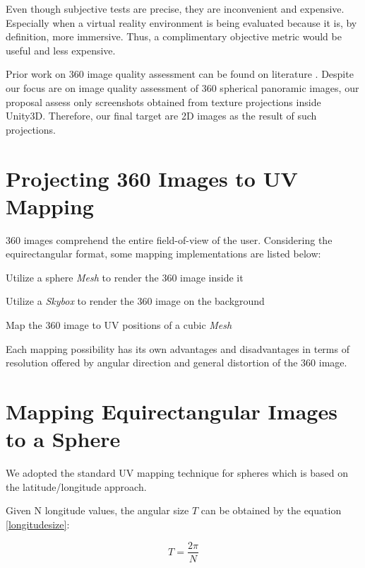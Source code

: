 \documentclass[12pt]{article}
\begin{document}
Even though subjective tests are precise, they are inconvenient and expensive. Especially when a virtual reality environment is being evaluated because it is, by definition, more immersive. Thus, a complimentary objective metric would be useful and less expensive.

Prior work on 360 image quality assessment can be found on literature \cite{md2015full} \cite{zakharchenko2016quality}. Despite our focus are on image quality assessment of 360 spherical panoramic images, our proposal assess only screenshots obtained from texture projections inside Unity3D. Therefore, our final target are 2D images as the result of such projections.

\section{Projecting 360 Images to UV Mapping}
360 images comprehend the entire field-of-view of the user. Considering the equirectangular format, some mapping implementations are listed below:

\begin{enumerate}
  \begin{item}Utilize a sphere \textit{Mesh} to render the 360 image inside it\end{item}
  \begin{item} Utilize a \textit{Skybox} to render the 360 image on the background\end{item}
  \begin{item} Map the 360 image to UV positions of a cubic \textit{Mesh} \end{item}
\end{enumerate}

Each mapping possibility has its own advantages and disadvantages in terms of resolution offered by angular direction and general distortion of the 360 image.

\section{Mapping Equirectangular Images to a Sphere}
We adopted the standard UV mapping technique for spheres which is based on the latitude/longitude approach.

Given N longitude values, the angular size $T$ can be obtained by the equation \ref{longitudesize}:

\begin{equation}
T = \frac{2 \pi}{N}
\label{longitudesize}
\end{equation}
\end{document}
